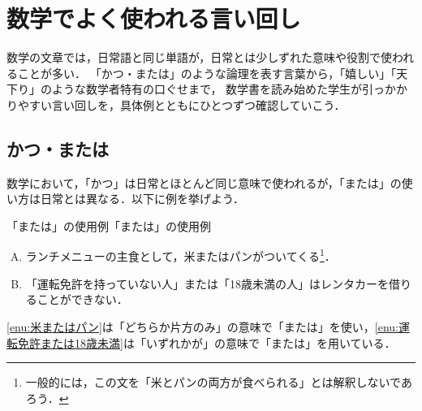 \section{数学でよく使われる言い回し}

数学の文章では，日常語と同じ単語が，日常とは少しずれた意味や役割で使われることが多い．
「かつ・または」のような論理を表す言葉から，「嬉しい」「天下り」のような数学者特有の口ぐせまで，
数学書を読み始めた学生が引っかかりやすい言い回しを，具体例とともにひとつずつ確認していこう．

\subsection{かつ・または}

数学において，「かつ」は日常とほとんど同じ意味で使われるが，「または」の使い方は日常とは異なる．以下に例を挙げよう．

\begin{example}{「または」の使用例}{「または」の使用例}
  \begin{enumerate}[(A)]
    \item ランチメニューの主食として，米またはパンがついてくる\footnote{一般的には，この文を「米とパンの両方が食べられる」とは解釈しないであろう．}．\label{enu:米またはパン}
    \item 「運転免許を持っていない人」または「18歳未満の人」はレンタカーを借りることができない． \label{enu:運転免許または18歳未満}
  \end{enumerate}
  \ref{enu:米またはパン}は「どちらか片方のみ」の意味で「または」を使い，\ref{enu:運転免許または18歳未満}は「いずれかが」の意味で「または」を用いている．
\end{example}

